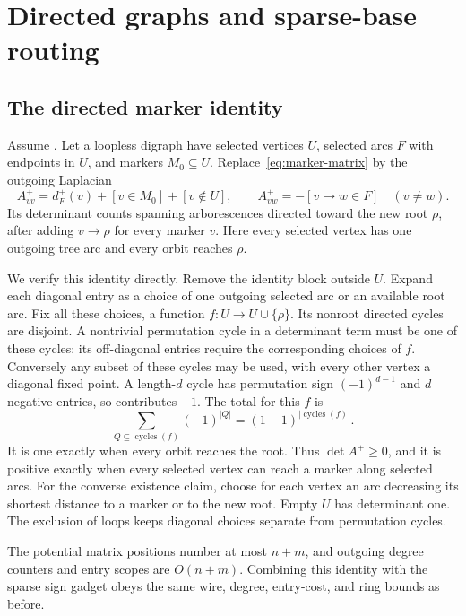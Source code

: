 \section{Directed graphs and sparse-base routing}
\label{sec:directed-routes}

\subsection{The directed marker identity}

Assume \HTC. Let a loopless digraph have selected vertices $U$,
selected arcs $F$ with endpoints in $U$, and markers $M_0\subseteq U$.
Replace~\eqref{eq:marker-matrix} by the outgoing Laplacian
\begin{equation}\label{eq:directed-matrix}
 A^+_{vv}=d^+_F(v)+[v\in M_0]+[v\notin U],\qquad
 A^+_{vw}=-[v\mathbin{\to}w\in F]\quad(v\ne w).
\end{equation}
Its determinant counts spanning arborescences directed toward the
new root $\rho$, after adding $v\to\rho$ for every marker $v$.
Here every selected vertex has one outgoing tree arc and every orbit
reaches $\rho$.

We verify this identity directly. Remove the identity block outside
$U$. Expand each diagonal entry as a choice of one outgoing selected
arc or an available root arc. Fix all these choices, a function
$f:U\to U\cup\{\rho\}$. Its nonroot directed cycles are disjoint.
A nontrivial permutation cycle in a determinant term must be one of
these cycles: its off-diagonal entries require the corresponding
choices of $f$. Conversely any subset of these cycles may be used,
with every other vertex a diagonal fixed point. A length-$d$ cycle
has permutation sign $(-1)^{d-1}$ and $d$ negative entries, so
contributes $-1$. The total for this $f$ is
\[
 \sum_{Q\subseteq\operatorname{cycles}(f)}(-1)^{|Q|}
 =(1-1)^{|\operatorname{cycles}(f)|}.
\]
It is one exactly when every orbit reaches the root. Thus
$\det A^+\ge0$, and it is positive exactly when every selected vertex
can reach a marker along selected arcs. For the converse existence
claim, choose for each vertex an arc decreasing its shortest distance
to a marker or to the new root. Empty $U$ has determinant one.
The exclusion of loops keeps diagonal choices separate from
permutation cycles.

The potential matrix positions number at most $n+m$, and outgoing
degree counters and entry scopes are $O(n+m)$. Combining this
identity with the sparse sign gadget obeys the same wire, degree,
entry-cost, and ring bounds as before.

